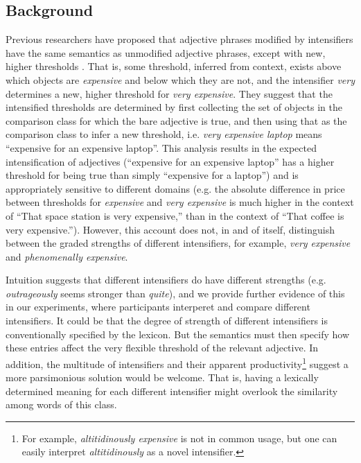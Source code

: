\documentclass[10pt,letterpaper]{article}
\newcommand{\w}[1]{\emph{#1}}
\begin{document}
\subsection{Background}
Previous researchers have proposed that adjective phrases modified by intensifiers have the same semantics as unmodified adjective phrases, except with new, higher thresholds \cite{kennedyMcnally, klein, wheeler}. That is, some threshold, inferred from context, exists above which objects are \w{expensive} and below which they are not, and the intensifier \w{very} determines a new, higher threshold for \w{very expensive}.
They suggest that the intensified thresholds are determined by first collecting the set of objects in the comparison class for which the bare adjective is true, and then using that as the comparison class to infer a new threshold, i.e. \w{very expensive laptop} means ``expensive for an expensive laptop''. This analysis results in the expected intensification of adjectives (``expensive for an expensive laptop'' has a higher threshold for being true than simply ``expensive for a laptop'') and is appropriately sensitive to different domains (e.g. the absolute difference in price between thresholds for \w{expensive} and \w{very expensive} is much higher in the context of ``That space station is very expensive,'' than in the context of ``That coffee is very expensive.'').
However, this account does not, in and of itself, distinguish between the graded strengths of different intensifiers, for example, \w{very expensive} and \w{phenomenally expensive}.

Intuition suggests that different intensifiers do have different strengths (e.g. \w{outrageously} seems stronger than \w{quite}), and we provide further evidence of this in our experiments, where participants interperet and compare different intensifiers.
It could be that the degree of strength of different intensifiers is conventionally specified by the lexicon. But the semantics must then specify how these entries affect the very flexible threshold of the relevant adjective.
In addition, the multitude of intensifiers \cite{bolinger} and their apparent productivity\footnote{For example, \w{altitidinously expensive} is not in common usage, but one can easily interpret \w{altitidinously} as a novel intensifier.} suggest a more parsimonious solution would be welcome. 
That is, having a lexically determined meaning for each different intensifier might overlook the similarity among words of this class.
\end{document}

